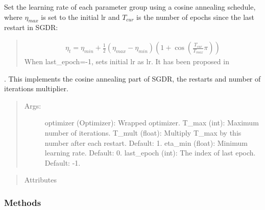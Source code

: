 \documentclass[letterpaper,10pt,english]{sphinxmanual}
\begin{document}
\begin{fulllineitems}
\label{\detokenize{index:pathflowai.schedulers.CosineAnnealingWithRestartsLR}}
Set the learning rate of each parameter group using a cosine annealing
schedule, where \(\eta_{max}\) is set to the initial lr and
\(T_{cur}\) is the number of epochs since the last restart in SGDR:
\begin{quote}
\begin{equation*}
\begin{split}\eta_t = \eta_{min} + \frac{1}{2}(\eta_{max} - \eta_{min})(1 +
\cos(\frac{T_{cur}}{T_{max}}\pi))\end{split}
\end{equation*}
When last\_epoch=-1, sets initial lr as lr.
It has been proposed in
\end{quote}

. This implements
the cosine annealing part of SGDR, the restarts and number of iterations multiplier.
\begin{quote}
\begin{description}
\item[{Args:}] \leavevmode
optimizer (Optimizer): Wrapped optimizer.
T\_max (int): Maximum number of iterations.
T\_mult (float): Multiply T\_max by this number after each restart. Default: 1.
eta\_min (float): Minimum learning rate. Default: 0.
last\_epoch (int): The index of last epoch. Default: -1.

\end{description}
\end{quote}
\begin{quote}\begin{description}
\item[{Attributes}] \leavevmode\begin{description}
\item[{}] \leavevmode
\end{description}

\end{description}\end{quote}
\subsubsection*{Methods}



\end{fulllineitems}
\end{document}
